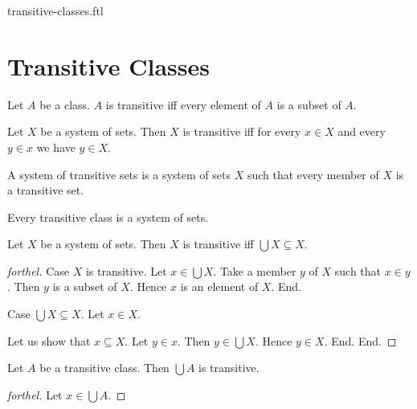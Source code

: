 \documentclass{naproche-library}
\begin{document}
\begin{smodule}{transitive-classes.ftl}

  \section*{Transitive Classes}

  \begin{definition}[forthel,id=SET_THEORY_01_8167915266244608]
    Let $A$ be a class.
    $A$ is transitive iff every element of $A$ is a subset of $A$.
  \end{definition}

  \begin{proposition}[forthel,id=SET_THEORY_01_6964770955591680]
    Let $X$ be a system of sets.
    Then $X$ is transitive iff for every $x \in X$ and every $y \in x$ we have $y \in X$.
  \end{proposition}

  \begin{definition}[forthel,id=SET_THEORY_01_4219967964708864]
    A system of transitive sets is a system of sets $X$ such that every member of $X$ is a transitive set.
  \end{definition}

  \begin{proposition}[forthel,id=SET_THEORY_01_2095807333400576]
    Every transitive class is a system of sets.
  \end{proposition}

  \begin{proposition}[forthel,id=SET_THEORY_01_6524117649981440]
    Let $X$ be a system of sets.
    Then $X$ is transitive iff $\bigcup X \subseteq X$.
  \end{proposition}
  \begin{proof}[forthel]
    Case $X$ is transitive.
      Let $x \in \bigcup X$.
      Take a member $y$ of $X$ such that $x \in y$.
      Then $y$ is a subset of $X$.
      Hence $x$ is an element of $X$.
    End.

    Case $\bigcup X \subseteq X$.
      Let $x \in X$.

      Let us show that $x \subseteq X$.
        Let $y \in x$.
        Then $y \in \bigcup X$.
        Hence $y \in X$.
      End.
    End.
  \end{proof}

  \begin{proposition}[forthel,id=SET_THEORY_01_620651482185728]
    Let $A$ be a transitive class.
    Then $\bigcup A$ is transitive.
  \end{proposition}
  \begin{proof}[forthel]
    Let $x \in \bigcup A$.


\end{proof}
\end{smodule}
\end{document}
